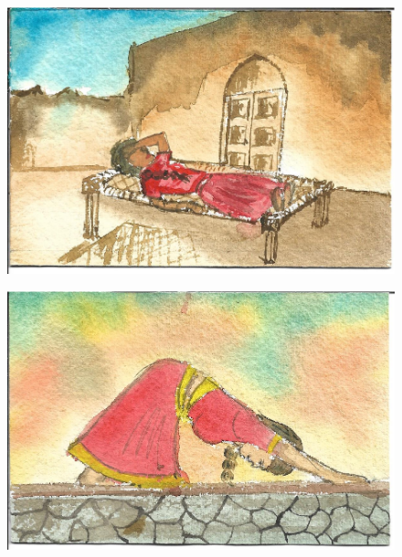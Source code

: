 \documentclass[12pt]{article}
\begin{document}
\begin{figure}[h!]
\centering
\includegraphics[width=.7\paperwidth]{pictures/AR}
\end{figure}

\newpage

\begin{figure}[h!]
\centering
\includegraphics[width=.7\paperwidth]{pictures/AE}
\end{figure}

\newpage
\end{document}
